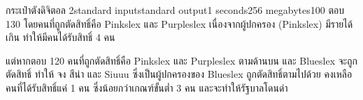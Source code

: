 \documentclass[11pt,a4paper]{article}
\begin{document}
\begin{problem}{กระเป๋าตังดิจิตอล 2}{standard input}{standard output}{1 seconds}{256 megabytes}{100}
ตอบ 130 โดยคนที่ถูกตัดสิทธิ์คือ Pinkslex และ Purpleslex เนื่องจากผู้ปกครอง (Pinkslex) มีรายได้เกิน ทำให้มีคนได้รับสิทธิ์ 4 คน

แต่หากตอบ 120 คนที่ถูกตัดสิทธิ์คือ Pinkslex และ Purpleslex ตามด้านบน และ Blueslex จะถูกตัดสิทธิ์ ทำให้ จง สีน่า และ Siuuu ซึ่งเป็นผู้ปกครองของ Blueslex ถูกตัดสิทธิ์ตามไปด้วย คงเหลือคนที่ได้รับสิทธิ์แค่ 1 คน ซึ่งน้อยกว่าเกณฑ์ขั้นต่ำ 3 คน และจะทำให้รัฐบาลโดนด่า

\end{problem}
\end{document}
